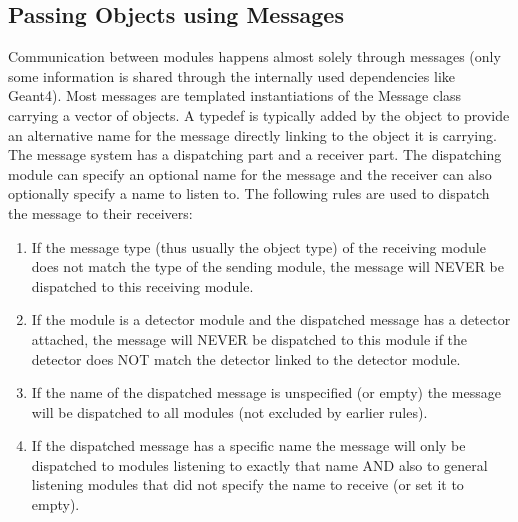 \subsection{Passing Objects using Messages}
\label{sec:objects_messages}
Communication between modules happens almost solely through messages (only some information is shared through the internally used dependencies like Geant4). Most messages are templated instantiations of the Message class carrying a vector of objects. A typedef is typically added by the object to provide an alternative name for the message directly linking to the object it is carrying. The message system has a dispatching part and a receiver part. The dispatching module can specify an optional name for the message and the receiver can also optionally specify a name to listen to. The following rules are used to dispatch the message to their receivers:
\begin{enumerate}
\item If the message type (thus usually the object type) of the receiving module does not match the type of the sending module, the message will NEVER be dispatched to this receiving module.
\item If the module is a detector module and the dispatched message has a detector attached, the message will NEVER be dispatched to this module if the detector does NOT match the detector linked to the detector module.
\item If the name of the dispatched message is unspecified (or empty) the message will be dispatched to all modules (not excluded by earlier rules).
\item If the dispatched message has a specific name the message will only be dispatched to modules listening to exactly that name AND also to general listening modules that did not specify the name to receive (or set it to empty).
\end{enumerate}

